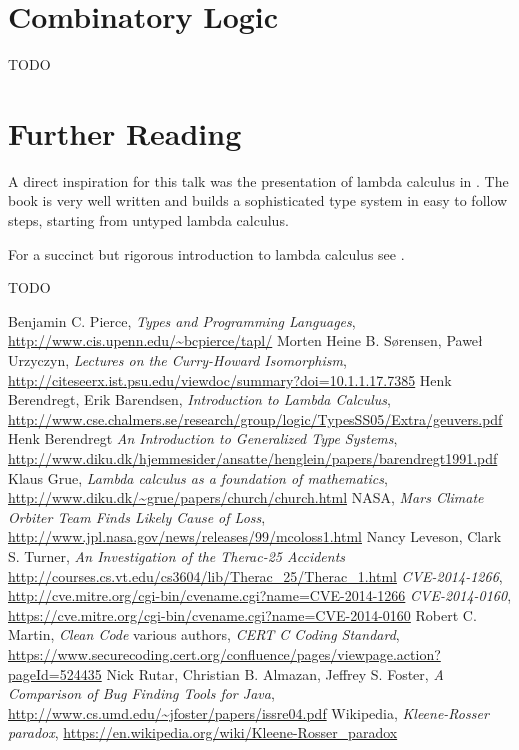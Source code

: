 \documentclass[11pt,twoside,a4paper]{article} %
\begin{document}
\section{Combinatory Logic}

TODO

\section{Further Reading}

A direct inspiration for this talk was the presentation of lambda calculus in
\cite{TAPL}. The book is very well written and builds a sophisticated type
system in easy to follow steps, starting from untyped lambda calculus. 

For a succinct but rigorous introduction to lambda calculus see \cite{bb00}.

TODO

\begin{thebibliography}{9}
 Benjamin C. Pierce, \emph{Types and Programming Languages},
\url{http://www.cis.upenn.edu/~bcpierce/tapl/}
 Morten Heine B. Sørensen, Paweł Urzyczyn, \emph{Lectures on the
Curry-Howard Isomorphism}, 
\url{http://citeseerx.ist.psu.edu/viewdoc/summary?doi=10.1.1.17.7385}
 Henk Berendregt, Erik Barendsen, \emph{Introduction to Lambda
Calculus}, 
\url{http://www.cse.chalmers.se/research/group/logic/TypesSS05/Extra/geuvers.pdf}
 Henk Berendregt \emph{An Introduction to Generalized Type Systems}, 
\url{http://www.diku.dk/hjemmesider/ansatte/henglein/papers/barendregt1991.pdf}
 Klaus Grue, \emph{Lambda calculus as a foundation of mathematics},
\url{http://www.diku.dk/~grue/papers/church/church.html}
 NASA, \emph{Mars Climate Orbiter Team Finds Likely Cause of Loss}, 
\url{http://www.jpl.nasa.gov/news/releases/99/mcoloss1.html}
 Nancy Leveson, Clark S. Turner, 
\emph{An Investigation of the Therac-25 Accidents}
\url{http://courses.cs.vt.edu/cs3604/lib/Therac_25/Therac_1.html}
 \emph{CVE-2014-1266},
\url{http://cve.mitre.org/cgi-bin/cvename.cgi?name=CVE-2014-1266}
 \emph{CVE-2014-0160}, 
\url{https://cve.mitre.org/cgi-bin/cvename.cgi?name=CVE-2014-0160}
 Robert C. Martin, \emph{Clean Code}
 various authors, \emph{CERT C Coding Standard}, 
\url{https://www.securecoding.cert.org/confluence/pages/viewpage.action?pageId=524435}
 Nick Rutar, Christian B. Almazan, Jeffrey S. Foster, \emph{A
Comparison of Bug Finding Tools for Java}, 
\url{http://www.cs.umd.edu/~jfoster/papers/issre04.pdf}
 Wikipedia, \emph{Kleene-Rosser paradox},
\url{https://en.wikipedia.org/wiki/Kleene-Rosser_paradox}
\end{thebibliography}
\end{document}
